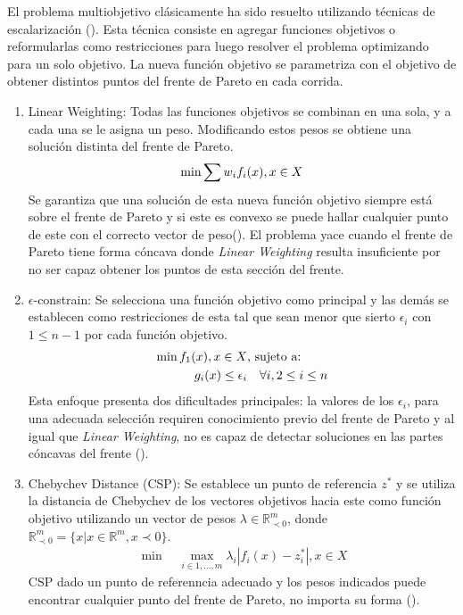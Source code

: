 El problema multiobjetivo cl\'asicamente ha sido resuelto utilizando t\'ecnicas de escalarizaci\'on (\cite{miettinen2012nonlinear}). Esta t\'ecnica consiste  en agregar funciones objetivos o  reformularlas como restricciones para luego resolver el problema optimizando para un solo objetivo. La nueva funci\'on objetivo se parametriza con el objetivo de obtener distintos puntos del frente de Pareto en cada corrida.
\begin{enumerate}
    \item Linear Weighting: Todas las funciones objetivos se combinan en una sola, y a cada una se le asigna un peso. Modificando estos pesos se obtiene una soluci\'on distinta del frente de Pareto.
    \begin{equation*}
        \min \sum w_i f_i(x), \space x \in X
    \end{equation*}
    Se garantiza que una soluci\'on de esta nueva funci\'on objetivo siempre est\'a sobre el frente de Pareto  y si este es convexo se puede hallar cualquier punto de este con el correcto vector de peso(\cite{emmerich2018tutorial}). El problema yace cuando el frente de Pareto tiene forma c\'oncava donde \textit{Linear Weighting} resulta insuficiente por no ser capaz obtener los puntos de esta secci\'on del frente.

    \item $\epsilon$-constrain: Se selecciona una funci\'on objetivo como principal y las dem\'as se establecen como restricciones de esta tal que sean menor que sierto $\epsilon_i$ con $1 \leq n - 1$ por cada funci\'on objetivo.
    \begin{align*}
            \min  f_1(x), \space x \in X  & \text{, sujeto a:}   \\
            g_i(x) \leq \epsilon_i & \quad  \forall i, 2 \leq i \leq n
    \end{align*}
    Esta enfoque presenta dos dificultades principales: la valores de los $\epsilon_i$, para una adecuada selecci\'on requiren conocimiento previo del frente de Pareto y al igual que \textit{Linear Weighting}, no es capaz de detectar soluciones en las partes c\'oncavas del frente (\cite{emmerich2018tutorial}).

\item Chebychev Distance (CSP): Se establece un punto de referencia $z^*$ y se utiliza la distancia de Chebychev de los vectores objetivos hacia este como funci\'on objetivo utilizando un vector de pesos $\lambda \in \mathbb{R}^m_{\prec 0}$, donde $\mathbb{R}^m_{\prec 0} = \{x | x \in \mathbb{R}^m, x \prec 0 \}$. 
    \begin{align*}
        \min \quad \max_{i \in {1,...,m}} \lambda_i |f_i(x) - z^*_i|, x \in X 
    \end{align*}
    CSP dado un punto de referenncia adecuado y los pesos indicados puede encontrar cualquier punto del frente de Pareto, no importa su forma (\cite{emmerich2018tutorial}).
\end{enumerate}

